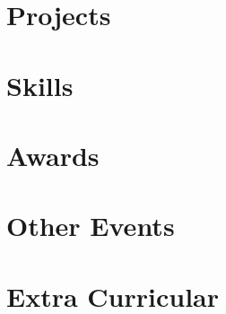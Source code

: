\documentclass[]{cv-style}          %
\begin{document}
\section{Projects\hrulefill}




\section{Skills\hrulefill}


\newpage

\section{Awards\hrulefill}



\section{Other Events\hrulefill}

  \vspace{-0.2cm}




\section{Extra Curricular\hrulefill}

  \vspace{-0.2cm}



\end{document}
